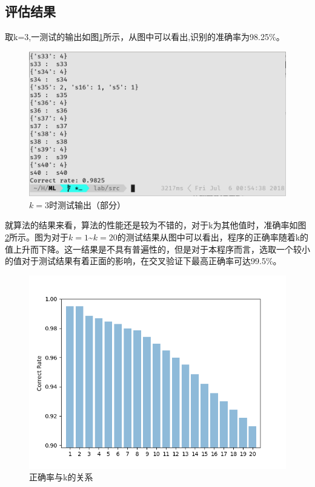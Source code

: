 \documentclass{article}
\begin{document}
\subsection{评估结果}
\label{sub:ping_gu_jie_guo_}

\par 取k=3,一测试的输出如图\ref{fig:output2}所示，从图中可以看出,识别的准确率为98.25\%。
\begin{figure}[htpb]
    \centering
    \includegraphics[width=0.95\linewidth]{output2.png}
    \caption{\(k=3\)时测试输出（部分）}
    \label{fig:output2}
\end{figure}

\par 就算法的结果来看，算法的性能还是较为不错的，对于k为其他值时，准确率如图\ref{fig:chart}所示。图为对于\(k=1\)\textasciitilde \(k=20\)的测试结果从图中可以看出，程序的正确率随着k的值上升而下降。这一结果是不具有普遍性的，但是对于本程序而言，选取一个较小的值对于测试结果有着正面的影响，在交叉验证下最高正确率可达99.5\%。

\begin{figure}[htpb]
    \centering
    \includegraphics[width=0.8\linewidth]{chart.png}
    \caption{正确率与k的关系}
    \label{fig:chart}
\end{figure}
\end{document}
